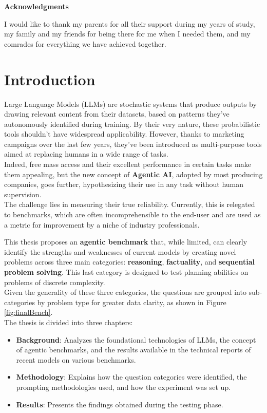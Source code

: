 \documentclass[12pt]{article}
\begin{document}
\clearpage

\textbf{Acknowledgments}

I would like to thank my parents for all their support during my years of study, my family and my friends for being there for me when I needed them, and my comrades for everything we have achieved together.
\clearpage
\tableofcontents
\clearpage
\listoffigures
\clearpage

\section{Introduction}

Large Language Models (LLMs) are stochastic systems that produce outputs by drawing relevant content from their datasets, based on patterns they've autonomously identified during training. By their very nature, these probabilistic tools shouldn't have widespread applicability. However, thanks to marketing campaigns over the last few years, they've been introduced as multi-purpose tools aimed at replacing humans in a wide range of tasks.\\
Indeed, free mass access and their excellent performance in certain tasks make them appealing, but the new concept of \textbf{Agentic AI}, adopted by most producing companies, goes further, hypothesizing their use in any task without human supervision.\\
The challenge lies in measuring their true reliability. Currently, this is relegated to benchmarks, which are often incomprehensible to the end-user and are used as a metric for improvement by a niche of industry professionals.

This thesis proposes an \textbf{agentic benchmark} that, while limited, can clearly identify the strengths and weaknesses of current models by creating novel problems across three main categories: \textbf{reasoning}, \textbf{factuality}, and \textbf{sequential problem solving}. This last category is designed to test planning abilities on problems of discrete complexity.\\ 
Given the generality of these three categories, the questions are grouped into sub-categories by problem type for greater data clarity, as shown in Figure \ref{fig:finalBench}.\\
The thesis is divided into three chapters:
\begin{itemize}
\item \textbf{Background}: Analyzes the foundational technologies of LLMs, the concept of agentic benchmarks, and the results available in the technical reports of recent models on various benchmarks.
\item \textbf{Methodology}: Explains how the question categories were identified, the prompting methodologies used, and how the experiment was set up.
\item \textbf{Results}: Presents the findings obtained during the testing phase.
\end{itemize}
\end{document}

